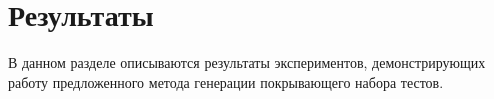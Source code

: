 \chapter{Результаты} 
\label{results}

В данном разделе описываются результаты экспериментов, демонстрирующих работу предложенного метода генерации покрывающего набора тестов. 

% 
% 
% 
% 
% 
